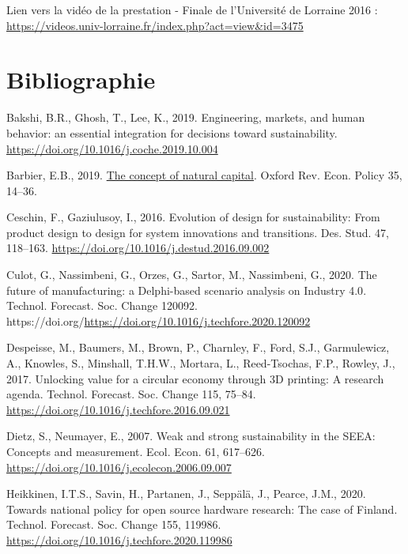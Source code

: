 \documentclass[
  11pt,
]{article}
\newlength{\cslhangindent}
\newlength{\cslentryspacingunit} %
\newenvironment{CSLReferences}[2] %
 {%
  \setlength{\parindent}{0pt}
  \ifodd #1
  \let\oldpar\par
  \def\par{\hangindent=\cslhangindent\oldpar}
  \fi
  \setlength{\parskip}{#2\cslentryspacingunit}
 }%
 {}
\begin{document}
Lien vers la vidéo de la prestation - Finale de l'Université de Lorraine
2016 : \url{https://videos.univ-lorraine.fr/index.php?act=view&id=3475}

\newpage

\hypertarget{bibliographie}{%
\section{Bibliographie}\label{bibliographie}}

\hypertarget{refs}{}
\begin{CSLReferences}{1}{0}
\leavevmode{}%
Bakshi, B.R., Ghosh, T., Lee, K., 2019. {Engineering, markets, and human
behavior: an essential integration for decisions toward sustainability}.
\url{https://doi.org/10.1016/j.coche.2019.10.004}

\leavevmode{}%
Barbier, E.B., 2019.
\href{https://academic.oup.com/oxrep/article/35/1/14/5267896}{{The
concept of natural capital}}. Oxford Rev. Econ. Policy 35, 14--36.

\leavevmode{}%
Ceschin, F., Gaziulusoy, I., 2016. {Evolution of design for
sustainability: From product design to design for system innovations and
transitions}. Des. Stud. 47, 118--163.
\url{https://doi.org/10.1016/j.destud.2016.09.002}

\leavevmode{}%
Culot, G., Nassimbeni, G., Orzes, G., Sartor, M., Nassimbeni, G., 2020.
{The future of manufacturing: a Delphi-based scenario analysis on
Industry 4.0}. Technol. Forecast. Soc. Change 120092.
https://doi.org/\url{https://doi.org/10.1016/j.techfore.2020.120092}

\leavevmode{}%
Despeisse, M., Baumers, M., Brown, P., Charnley, F., Ford, S.J.,
Garmulewicz, A., Knowles, S., Minshall, T.H.W., Mortara, L.,
Reed-Tsochas, F.P., Rowley, J., 2017. {Unlocking value for a circular
economy through 3D printing: A research agenda}. Technol. Forecast. Soc.
Change 115, 75--84. \url{https://doi.org/10.1016/j.techfore.2016.09.021}

\leavevmode{}%
Dietz, S., Neumayer, E., 2007. {Weak and strong sustainability in the
SEEA: Concepts and measurement}. Ecol. Econ. 61, 617--626.
\url{https://doi.org/10.1016/j.ecolecon.2006.09.007}

\leavevmode{}%
Heikkinen, I.T.S., Savin, H., Partanen, J., Seppälä, J., Pearce, J.M.,
2020. {Towards national policy for open source hardware research: The
case of Finland}. Technol. Forecast. Soc. Change 155, 119986.
\url{https://doi.org/10.1016/j.techfore.2020.119986}


\end{CSLReferences}
\end{document}
